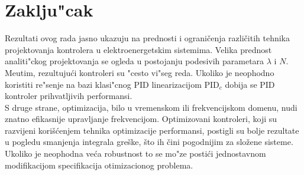 \documentclass[a4paper,11pt]{article}
\theoremstyle{definition} \newtheorem{deff}{Definicija}[section]
\theoremstyle{definition} \newtheorem{prim}[deff]{Primer}
\theoremstyle{plain} \newtheorem{teor}[deff]{Teorema}
\begin{document}
	\begin{table}[!h]
		\label{tab:result_noise}
	\end{table}
		
		
	


	
	\clearpage
	\section{Zaklju"cak}\label{sec:zakljucak}
	
	Rezultati ovog rada jasno ukazuju na prednosti i ograničenja različitih tehnika projektovanja kontrolera u elektroenergetskim sistemima. Velika prednost analiti"ckog projektovanja se ogleda u postojanju podesivih parametara $\lambda$ i $N$. Me\dj{}utim, rezultuju\'ci kontroleri su "cesto vi"seg reda. Ukoliko je neophodno koristiti re"senje na bazi klasi"cnog PID linearizacijom PID$_c$ dobija se PID kontroler prihvatljivih performansi.\\
	
	S druge strane, optimizacija, bilo u vremenskom ili frekvencijskom domenu, nudi znatno efikasnije upravljanje frekvencijom. Optimizovani kontroleri, koji su razvijeni korišćenjem tehnika optimizacije performansi, postigli su bolje rezultate u pogledu smanjenja integrala greške, što ih čini pogodnijim za složene sisteme. Ukoliko je neophodna ve\'ca robustnost to se mo"ze posti\'ci jednostavnom modifikacijom specifikacija otimizacionog problema. \\
	
\end{document}
